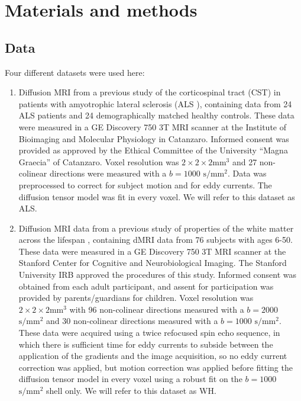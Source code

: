\documentclass[10pt,letterpaper]{article}
\begin{document}
\section*{Materials and methods}
\label{sec:methods}

\subsection*{Data}
\label{sec:data}

Four different datasets were used here:

\begin{enumerate}

\item Diffusion MRI from a previous study of the corticospinal
tract (CST) in patients with amyotrophic lateral sclerosis
(ALS \cite{sarica2017corticospinal}), containing data from 24 ALS
patients and 24 demographically matched healthy controls. These data
were measured in a GE Discovery 750 3T MRI scanner at the Institute
of Bioimaging and Molecular Physiology in Catanzaro. Informed consent
was provided as approved by the Ethical Committee of the University
``Magna Graecia'' of Catanzaro. Voxel resolution was
$2 \times 2 \times 2 \text{mm}^3$ and 27 non-colinear directions were measured with a
$b=1000$ $\text{s} / \text{mm}^2$. Data was preprocessed to
correct for subject motion and for eddy currents. The diffusion tensor
model \cite{basser1994mr} was fit in every voxel.
We will refer to this dataset as ALS.

\item Diffusion MRI data from a previous study of properties of
the white matter across the lifespan \cite{yeatman2014lifespan},
containing dMRI data from 76 subjects with ages 6-50. These data were
measured in a GE Discovery 750 3T MRI scanner at the Stanford Center
for Cognitive and Neurobiological Imaging. The Stanford University
IRB approved the procedures of this study. Informed consent was
obtained from each adult participant, and assent for participation
was provided by parents/guardians for children. Voxel resolution was
$2 \times 2 \times 2 \textrm{mm}^3$ with 96 non-colinear directions measured with a
$b=2000$ $\textrm{s} / \textrm{mm}^2$ and 30 non-colinear directions
measured with a $b=1000$ $\textrm{s} / \textrm{mm}^2$. These data
were acquired using a twice refocused spin echo sequence, in which there is
sufficient time for eddy currents to subside between the application of
the gradients and the image acquisition, so no eddy current correction
was applied, but motion correction was applied before fitting the
diffusion tensor model \cite{basser1994mr} in every voxel using a robust
fit \cite{chang2005restore}
on the \protect$b=1000$ \protect$\textrm{s} / \textrm{mm}^2$ shell only.
We will refer to this dataset as WH.


\end{enumerate}
\end{document}
